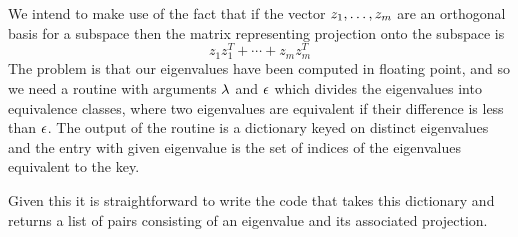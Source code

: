 We intend to make use of the fact that if the vector $z_{1},\ldots,z_{m}$ are an orthogonal basis
for a subspace then the matrix representing projection onto the subspace is
\[
	z_1z_1^T+\cdots+z_mz_m^T
\]
The problem is that our eigenvalues have been computed in floating point, and
so we need a routine with arguments $\lambda$ and $\epsilon$ which divides the
eigenvalues into equivalence classes, where two eigenvalues are equivalent if their
difference is less than $\epsilon$. The output of the routine
is a dictionary keyed on distinct eigenvalues and the entry with given eigenvalue
is the set of indices of the eigenvalues equivalent to the key.

Given this it is straightforward to write the code that takes this dictionary and
returns a list of pairs consisting of an eigenvalue and its associated projection.

